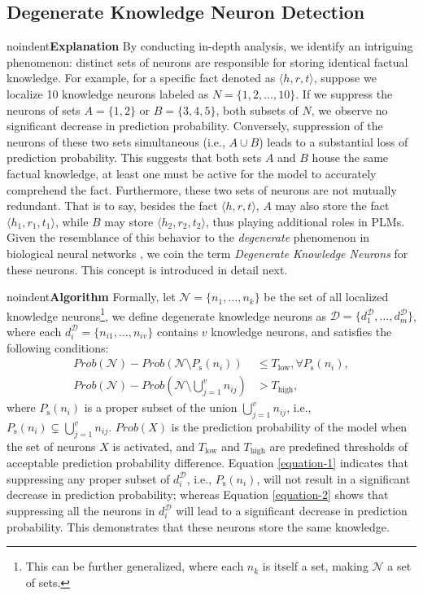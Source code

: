 \documentclass[]{article}
\newcommand{\vpara}[1]{noindent\textbf{#1 }}%
\begin{document}
\subsection{Degenerate Knowledge Neuron Detection}
\vpara{Explanation}
By conducting in-depth analysis, we identify an intriguing phenomenon: distinct sets of neurons are responsible for storing identical factual knowledge. For example, for a specific fact denoted as \(\langle h,r,t\rangle \), suppose we localize 10 knowledge neurons labeled as \(N = \{1, 2, \ldots, 10\}\). If we suppress the neurons of sets \(A = \{1, 2\}\) or \(B = \{3, 4, 5\}\), both subsets of $N$, we observe no significant decrease in prediction probability. Conversely, suppression of the neurons of these two sets simultaneous (i.e., \(A \cup B\)) leads to a substantial loss of prediction probability. This suggests that both sets \(A\) and \(B\) house the same factual knowledge, at least one must be active for the model to accurately comprehend the fact. Furthermore, these two sets of neurons are not mutually redundant. That is to say, besides the fact \(\langle h,r,t\rangle \), \(A\) may also store the fact \(\langle h_1, r_1, t_1\rangle \), while \(B\) may store \(\langle h_2, r_2, t_2\rangle \), thus playing additional roles in PLMs.
Given the resemblance of this behavior to the \textit{degenerate} phenomenon in biological neural networks \cite{degenerate_biological,mason2015degeneracy}, we coin the term \textit{Degenerate Knowledge Neurons} for these neurons. This concept is introduced in detail next.

\vpara{Algorithm}
Formally, let $\mathcal{N}=\{n_1, \ldots, n_k\}$ be the set of all localized knowledge neurons\footnote{This can be further generalized, where each $n_k$ is itself a set, making $\mathcal{N}$ a set of sets.}, we define degenerate knowledge neurons as $\mathcal{D} = \{d^{\mathcal{D}}_1, \ldots, d^{\mathcal{D}}_m \}$, where each $d^{\mathcal{D}}_i=\{n_{i1}, \ldots, n_{iv}\}$ contains $v$ knowledge neurons, and satisfies the following conditions:
{\small \begin{align}
Prob(\mathcal{N}) - Prob(\mathcal{N}\setminus P_{\text{s}}(n_i)) &\leq T_{\text{low}}, \forall P_{\text{s}}(n_i), \label{equation-1}\\
Prob(\mathcal{N}) - Prob(\mathcal{N}\setminus \bigcup_{j=1}^v n_{ij}) &> T_{\text{high}} \label{equation-2},
\end{align}}where $P_{\text{s}}(n_i)$ is a proper subset of the union $\bigcup_{j=1}^v n_{ij}$, i.e., $P_{\text{s}}(n_i) \subsetneq \bigcup_{j=1}^v n_{ij}$. \(Prob(X)\) is the prediction probability of the model when the set of neurons \(X\) is activated, and \(T_{\text{low}}\) and \(T_{\text{high}}\) are predefined thresholds of acceptable prediction probability difference. Equation \eqref{equation-1} indicates that suppressing any proper subset of \(d^{\mathcal{D}}_i\), i.e., $P_{\text{s}}(n_i)$, will not result in a significant decrease in prediction probability; whereas Equation \eqref{equation-2} shows that suppressing all the neurons in \(d^{\mathcal{D}}_i\) will lead to a significant decrease in prediction probability. This demonstrates that these neurons store the same knowledge.
\end{document}

